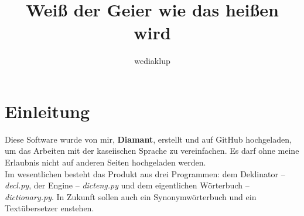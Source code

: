\documentclass[12pt,a4paper]{article}
\author{wediaklup}
\title{Weiß der Geier wie das heißen wird}
\begin{document}
\maketitle
\tableofcontents

\section{Einleitung}
Diese Software wurde von mir, \textbf{Diamant}, erstellt und auf GitHub hochgeladen, um das Arbeiten mit der kaseiischen Sprache zu vereinfachen. Es darf ohne meine Erlaubnis nicht auf anderen Seiten hochgeladen werden. \\
Im wesentlichen besteht das Produkt aus drei Programmen: dem Deklinator – \textit{decl.py}, der Engine – \textit{dicteng.py} und dem eigentlichen Wörterbuch – \textit{dictionary.py}. In Zukunft sollen auch ein Synonymwörterbuch und ein Textübersetzer enstehen.
\end{document}
